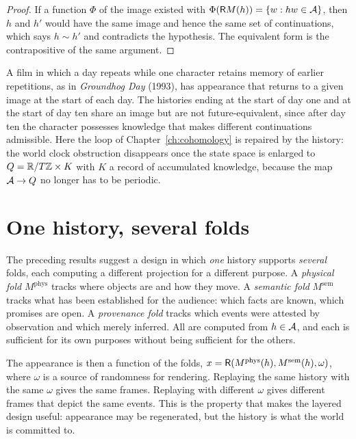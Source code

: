 \begin{proof}
If a function $\Phi$ of the image existed with $\Phi(\mathsf{R} M(h))=\{w:hw\in\mathcal{A}\}$, then $h$ and $h'$ would have the same image and hence the same set of continuations, which says $h\sim h'$ and contradicts the hypothesis. The equivalent form is the contrapositive of the same argument.
\end{proof}

\begin{example}\label{ex:groundhog}
A film in which a day repeats while one character retains memory of earlier repetitions, as in \emph{Groundhog Day} (1993), has appearance that returns to a given image at the start of each day. The histories ending at the start of day one and at the start of day ten share an image but are not future-equivalent, since after day ten the character possesses knowledge that makes different continuations admissible. Here the loop of Chapter~\ref{ch:cohomology} is repaired by the history: the world clock obstruction disappears once the state space is enlarged to $Q=\mathbb{R}/T\mathbb{Z}\times K$ with $K$ a record of accumulated knowledge, because the map $\mathcal{A}\to Q$ no longer has to be periodic.
\end{example}

\section{One history, several folds}

The preceding results suggest a design in which \emph{one} history supports \emph{several} folds, each computing a different projection for a different purpose. A \emph{physical fold} $M^{\mathrm{phys}}$ tracks where objects are and how they move. A \emph{semantic fold} $M^{\mathrm{sem}}$ tracks what has been established for the audience: which facts are known, which promises are open. A \emph{provenance fold} tracks which events were attested by observation and which merely inferred. All are computed from $h\in\mathcal{A}$, and each is sufficient for its own purposes without being sufficient for the others.

The appearance is then a function of the folds, $x=\mathsf{R}(M^{\mathrm{phys}}(h),M^{\mathrm{sem}}(h),\omega)$, where $\omega$ is a source of randomness for rendering. Replaying the same history with the same $\omega$ gives the same frames. Replaying with different $\omega$ gives different frames that depict the same events. This is the property that makes the layered design useful: appearance may be regenerated, but the history is what the world is committed to.


